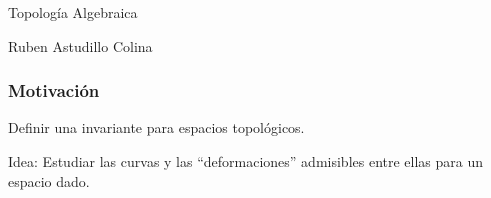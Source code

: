 \documentclass[xetex,mathserif,serif]{beamer}
\begin{document}
  \begin{frame}
    \begin{block}{}
      \centering
      Topología Algebraica
    \end{block}
    \begin{block}{}
      \centering
      Ruben Astudillo Colina
    \end{block}

  \end{frame}

  \begin{frame}
    \frametitle{Motivación}

    \begin{block}{}
      Definir una invariante para espacios topológicos.
    \end{block}

    \pause

    \begin{block}{}
      Idea: Estudiar las curvas y las ``deformaciones'' admisibles entre
      ellas para un espacio dado.
    \end{block}
  \end{frame}
\end{document}
